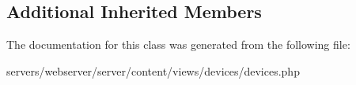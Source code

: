 \subsection*{Additional Inherited Members}


The documentation for this class was generated from the following file\+:\begin{DoxyCompactItemize}
\item 
servers/webserver/server/content/views/devices/devices.\+php\end{DoxyCompactItemize}
